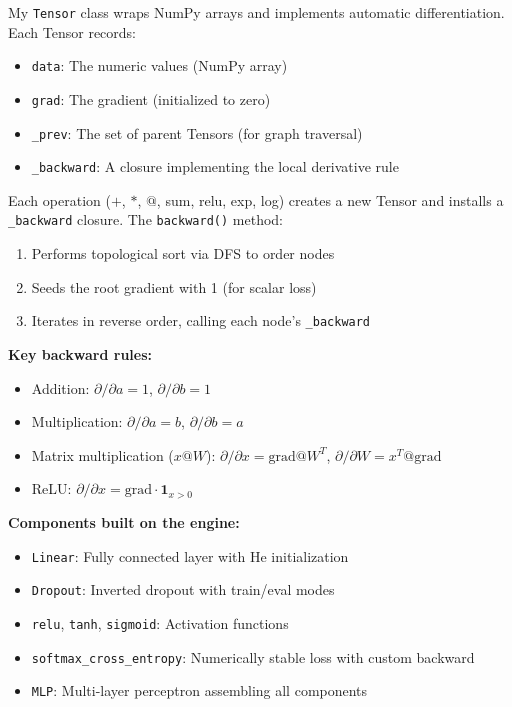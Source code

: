 \documentclass[11pt,a4paper]{article}
\begin{document}
My \texttt{Tensor} class wraps NumPy arrays and implements automatic differentiation. Each Tensor records:
\begin{itemize}
    \item \texttt{data}: The numeric values (NumPy array)
    \item \texttt{grad}: The gradient (initialized to zero)
    \item \texttt{\_prev}: The set of parent Tensors (for graph traversal)
    \item \texttt{\_backward}: A closure implementing the local derivative rule
\end{itemize}

Each operation ($+$, $*$, $@$, sum, relu, exp, log) creates a new Tensor and installs a \texttt{\_backward} closure. The \texttt{backward()} method:
\begin{enumerate}
    \item Performs topological sort via DFS to order nodes
    \item Seeds the root gradient with 1 (for scalar loss)
    \item Iterates in reverse order, calling each node's \texttt{\_backward}
\end{enumerate}

\textbf{Key backward rules:}
\begin{itemize}
    \item Addition: $\partial/\partial a = 1$, $\partial/\partial b = 1$
    \item Multiplication: $\partial/\partial a = b$, $\partial/\partial b = a$
    \item Matrix multiplication ($x @ W$): $\partial/\partial x = \text{grad} @ W^T$, $\partial/\partial W = x^T @ \text{grad}$
    \item ReLU: $\partial/\partial x = \text{grad} \cdot \mathbf{1}_{x>0}$
\end{itemize}

\textbf{Components built on the engine:}
\begin{itemize}
    \item \texttt{Linear}: Fully connected layer with He initialization
    \item \texttt{Dropout}: Inverted dropout with train/eval modes
    \item \texttt{relu}, \texttt{tanh}, \texttt{sigmoid}: Activation functions
    \item \texttt{softmax\_cross\_entropy}: Numerically stable loss with custom backward
    \item \texttt{MLP}: Multi-layer perceptron assembling all components
\end{itemize}
\end{document}
